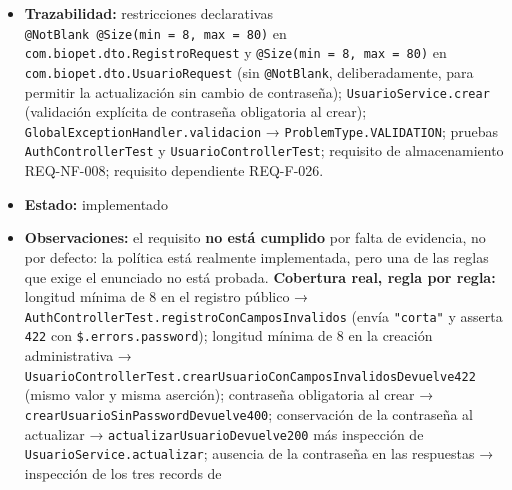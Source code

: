 \documentclass[
  spanish,
]{article}
\begin{document}
\begin{itemize}
  \texttt{Auth\allowbreak{}Response} y \texttt{Auth\allowbreak{}Session\allowbreak{}Response}, ninguno de los
  cuales declara campo de contraseña. Criterio 6: ver REQ-NF-008.
  \textbf{El límite superior de 80 caracteres del criterio 2 no tiene
  ninguna prueba automatizada} --- ver Observaciones.
\item
  \textbf{Trazabilidad:} restricciones declarativas
  \texttt{@Not\allowbreak{}Blank\ @Size(min\ =\ 8,\allowbreak{}\ max\ =\ 80)} en
  \texttt{com.\allowbreak{}biopet.\allowbreak{}dto.\allowbreak{}Registro\allowbreak{}Request} y
  \texttt{@Size(min\ =\ 8,\allowbreak{}\ max\ =\ 80)} en
  \texttt{com.\allowbreak{}biopet.\allowbreak{}dto.\allowbreak{}Usuario\allowbreak{}Request} (sin \texttt{@Not\allowbreak{}Blank},
  deliberadamente, para permitir la actualización sin cambio de
  contraseña); \texttt{Usuario\allowbreak{}Service.\allowbreak{}crear} (validación explícita de
  contraseña obligatoria al crear);
  \texttt{Global\allowbreak{}Exception\allowbreak{}Handler.\allowbreak{}validacion} →
  \texttt{Problem\allowbreak{}Type.\allowbreak{}VALIDATION}; pruebas \texttt{Auth\allowbreak{}Controller\allowbreak{}Test} y
  \texttt{Usuario\allowbreak{}Controller\allowbreak{}Test}; requisito de almacenamiento
  REQ-NF-008; requisito dependiente REQ-F-026.
\item
  \textbf{Estado:} implementado
\item
  \textbf{Observaciones:} el requisito \textbf{no está cumplido} por
  falta de evidencia, no por defecto: la política está realmente
  implementada, pero una de las reglas que exige el enunciado no está
  probada. \textbf{Cobertura real, regla por regla:} longitud mínima de
  8 en el registro público →
  \texttt{Auth\allowbreak{}Controller\allowbreak{}Test.\allowbreak{}registro\allowbreak{}Con\allowbreak{}Campos\allowbreak{}Invalidos} (envía
  \texttt{"corta"} y asserta \texttt{422} con
  \texttt{\$.\allowbreak{}errors.\allowbreak{}password}); longitud mínima de 8 en la creación
  administrativa →
  \texttt{Usuario\allowbreak{}Controller\allowbreak{}Test.\allowbreak{}crear\allowbreak{}Usuario\allowbreak{}Con\allowbreak{}Campos\allowbreak{}Invalidos\allowbreak{}Devuelve422}
  (mismo valor y misma aserción); contraseña obligatoria al crear →
  \texttt{crear\allowbreak{}Usuario\allowbreak{}Sin\allowbreak{}Password\allowbreak{}Devuelve400}; conservación de la
  contraseña al actualizar → \texttt{actualizar\allowbreak{}Usuario\allowbreak{}Devuelve200} más
  inspección de \texttt{Usuario\allowbreak{}Service.\allowbreak{}actualizar}; ausencia de la
  contraseña en las respuestas → inspección de los tres records de

\end{itemize}
\end{document}
